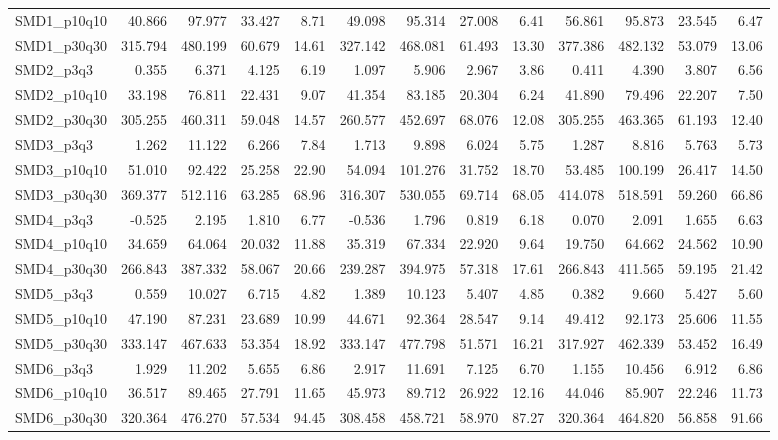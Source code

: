 \begin{longtable}{lrrrrrrrrrrrr}
SMD1\_p10q10 & 40.866 & 97.977 & 33.427 & 8.71 & 49.098 & 95.314 & 27.008 & 6.41 & 56.861 & 95.873 & 23.545 & 6.47 \\
SMD1\_p30q30 & 315.794 & 480.199 & 60.679 & 14.61 & 327.142 & 468.081 & 61.493 & 13.30 & 377.386 & 482.132 & 53.079 & 13.06 \\
SMD2\_p3q3 & 0.355 & 6.371 & 4.125 & 6.19 & 1.097 & 5.906 & 2.967 & 3.86 & 0.411 & 4.390 & 3.807 & 6.56 \\
SMD2\_p10q10 & 33.198 & 76.811 & 22.431 & 9.07 & 41.354 & 83.185 & 20.304 & 6.24 & 41.890 & 79.496 & 22.207 & 7.50 \\
SMD2\_p30q30 & 305.255 & 460.311 & 59.048 & 14.57 & 260.577 & 452.697 & 68.076 & 12.08 & 305.255 & 463.365 & 61.193 & 12.40 \\
SMD3\_p3q3 & 1.262 & 11.122 & 6.266 & 7.84 & 1.713 & 9.898 & 6.024 & 5.75 & 1.287 & 8.816 & 5.763 & 5.73 \\
SMD3\_p10q10 & 51.010 & 92.422 & 25.258 & 22.90 & 54.094 & 101.276 & 31.752 & 18.70 & 53.485 & 100.199 & 26.417 & 14.50 \\
SMD3\_p30q30 & 369.377 & 512.116 & 63.285 & 68.96 & 316.307 & 530.055 & 69.714 & 68.05 & 414.078 & 518.591 & 59.260 & 66.86 \\
SMD4\_p3q3 & -0.525 & 2.195 & 1.810 & 6.77 & -0.536 & 1.796 & 0.819 & 6.18 & 0.070 & 2.091 & 1.655 & 6.63 \\
SMD4\_p10q10 & 34.659 & 64.064 & 20.032 & 11.88 & 35.319 & 67.334 & 22.920 & 9.64 & 19.750 & 64.662 & 24.562 & 10.90 \\
SMD4\_p30q30 & 266.843 & 387.332 & 58.067 & 20.66 & 239.287 & 394.975 & 57.318 & 17.61 & 266.843 & 411.565 & 59.195 & 21.42 \\
SMD5\_p3q3 & 0.559 & 10.027 & 6.715 & 4.82 & 1.389 & 10.123 & 5.407 & 4.85 & 0.382 & 9.660 & 5.427 & 5.60 \\
SMD5\_p10q10 & 47.190 & 87.231 & 23.689 & 10.99 & 44.671 & 92.364 & 28.547 & 9.14 & 49.412 & 92.173 & 25.606 & 11.55 \\
SMD5\_p30q30 & 333.147 & 467.633 & 53.354 & 18.92 & 333.147 & 477.798 & 51.571 & 16.21 & 317.927 & 462.339 & 53.452 & 16.49 \\
SMD6\_p3q3 & 1.929 & 11.202 & 5.655 & 6.86 & 2.917 & 11.691 & 7.125 & 6.70 & 1.155 & 10.456 & 6.912 & 6.86 \\
SMD6\_p10q10 & 36.517 & 89.465 & 27.791 & 11.65 & 45.973 & 89.712 & 26.922 & 12.16 & 44.046 & 85.907 & 22.246 & 11.73 \\
SMD6\_p30q30 & 320.364 & 476.270 & 57.534 & 94.45 & 308.458 & 458.721 & 58.970 & 87.27 & 320.364 & 464.820 & 56.858 & 91.66 \\

\end{longtable}
